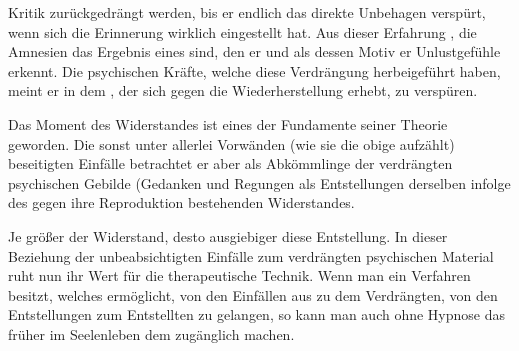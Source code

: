 \documentclass[twoside=true,titlepage=false,open=any, parskip=never, fontsize=10pt, headings=small, chapterprefix=false, appendixprefix=false]{scrbook}
\begin{document}
               Kritik zurückgedrängt werden, bis er endlich das direkte Unbehagen verspürt,
               wenn sich die Erinnerung wirklich eingestellt hat. Aus dieser Erfahrung
               ,  die Amnesien das Ergebnis eines  sind, den er 
                und als dessen Motiv er Unlustgefühle erkennt. Die psychischen Kräfte,
               welche diese Verdrängung herbeigeführt haben, meint er in dem , der sich gegen die Wiederherstellung erhebt, zu
                  verspüren.
        \pend
    


            
        \pstart
        Das Moment des Widerstandes ist eines der Fundamente seiner Theorie geworden.
               Die sonst unter allerlei Vorwänden (wie sie die obige  aufzählt) beseitigten Einfälle betrachtet er aber als Abkömmlinge der
               verdrängten psychischen Gebilde (Gedanken und Regungen als Entstellungen derselben infolge des gegen ihre Reproduktion
               bestehenden Widerstandes.
        \pend
    
            
        \pstart
        Je größer  der Widerstand, desto ausgiebiger diese Entstellung. In dieser Beziehung der unbeabsichtigten
               Einfälle zum verdrängten psychischen Material ruht nun ihr Wert für
               die therapeutische Technik. Wenn man ein Verfahren besitzt, welches ermöglicht,
               von den Einfällen aus zu dem Verdrängten, von den Entstellungen zum Entstellten
               zu gelangen, so kann man auch ohne Hypnose das früher  im Seelenleben dem
                zugänglich machen.
        \pend
    
\end{document}
